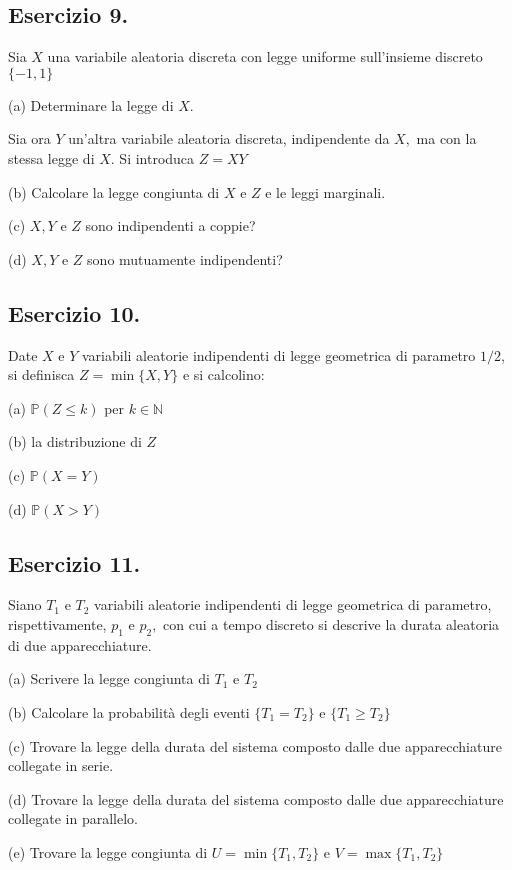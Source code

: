 \subsection{Esercizio 9.}

Sia $X$ una variabile aleatoria discreta con legge uniforme sull'insieme discreto $\{-1,1\}$

(a) Determinare la legge di $X$.

Sia ora $Y$ un'altra variabile aleatoria discreta, indipendente da $X,$ ma con la stessa legge di $X$. Si introduca $Z=XY$

(b) Calcolare la legge congiunta di $X$ e $Z$ e le leggi marginali.

(c) $X,Y$ e $Z$ sono indipendenti a coppie?

(d) $X,Y$ e $Z$ sono mutuamente indipendenti?
\subsection{Esercizio 10.}

Date $X$ e $Y$ variabili aleatorie indipendenti di legge geometrica di parametro $1/2$, si definisca $Z=\min \{X,Y\}$ e si calcolino:

(a) $\mathbb{P} (Z\leq k)$ per $k\in \mathbb{N}$

(b) la distribuzione di $Z$

(c) $\mathbb{P} (X=Y)$

(d) $\mathbb{P} (X >Y)$
\subsection{Esercizio 11.}

Siano $T_{1}$ e $T_{2}$ variabili aleatorie indipendenti di legge geometrica di parametro, rispettivamente, $p_{1}$ e $p_{2} ,$ con cui a tempo discreto si descrive la durata aleatoria di due apparecchiature.

(a) Scrivere la legge congiunta di $T_{1}$ e $T_{2}$

(b) Calcolare la probabilità degli eventi $\{T_{1} =T_{2}\}$ e $\{T_{1} \geq T_{2}\}$

(c) Trovare la legge della durata del sistema composto dalle due apparecchiature collegate in serie.

(d) Trovare la legge della durata del sistema composto dalle due apparecchiature collegate in parallelo.

(e) Trovare la legge congiunta di $U=\min\{T_{1} ,T_{2}\}$ e $V=\max\{T_{1} ,T_{2}\}$

